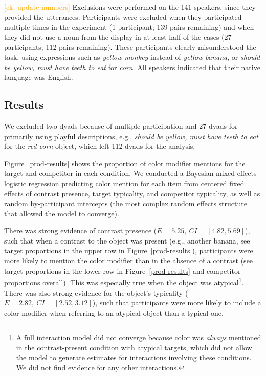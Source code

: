 \documentclass[a4paper,man,floatsintext,natbib]{apa6}
\newcommand{\ek}[1]{\textcolor{Orange}{[ek: #1]}}
\newcommand{\figref}[1]{Figure~\ref{#1}}
\begin{document}
\ek{update numbers} Exclusions were performed on the 141 speakers, since they provided the utterances. Participants were excluded when they participated multiple times in the experiment (1 participant; 139 pairs remaining) and when they did not use a noun from the display in at least half of the cases (27 participants; 112 pairs remaining). These participants clearly misunderstood the task, using expressions such as \textit{yellow monkey} instead of \textit{yellow banana}, or \textit{should be yellow, must have teeth to eat} for \textit{corn}. All speakers indicated that their native language was English.

\subsection{Results}

We excluded two dyads because of multiple participation and 27 dyads for primarily using playful descriptions, e.g., \textit{should be yellow, must have teeth to eat} for the \textit{red corn} object, which left 112 dyads for the analysis.

\figref{prod-results} shows the proportion of color modifier mentions for the target and competitor in each condition. We conducted a Bayesian mixed effects logistic regression predicting color mention for each item from centered fixed effects of contrast presence, target typicality, and competitor typicality, as well as random by-participant intercepts (the most complex random effects structure that allowed the model to converge). 

There was strong evidence of contrast presence ($E=5.25,\ CI=[4.82, 5.69]$), such that when a contrast to the object was present (e.g., another banana, see target proportions in the upper row in \figref{prod-results}), participants were more likely to mention the color modifier than in the absence of a contrast (see target proportions in the lower row in \figref{prod-results} and competitor proportions overall). This was especially true when the object was atypical\footnote{A full interaction model did not converge because color was \emph{always} mentioned in the contrast-present condition with atypical targets, which did not allow the model to generate estimates for interactions involving these conditions. We did not find evidence for any other interactions.}. There was also strong evidence for the object's typicality ($E=2.82,\ CI=[2.52, 3.12]$), such that participants were more likely to include a color modifier when referring to an atypical object than a typical one.
\end{document}
